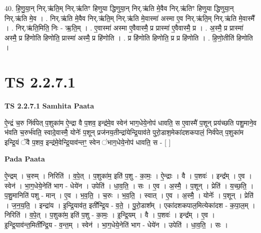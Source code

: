 \documentclass[17pt]{extarticle}
\begin{document}
40. हि॒णु॒या॒न् निर्.ऋ॑ति॒म् निर्.ऋ॑तिꣳ हिणुया द्धिणुया॒न् निर्.ऋ॑ति मे॒वैव निर्.ऋ॑तिꣳ हिणुया द्धिणुया॒न् निर्.ऋ॑ति मे॒व । . निर्.ऋ॑ति मे॒वैव निर्.ऋ॑ति॒म् निर्.ऋ॑ति मे॒वास्मा॑ अस्मा ए॒व निर्.ऋ॑ति॒म् निर्.ऋ॑ति मे॒वास्मै᳚ । . निर्.ऋ॑ति॒मिति॒ निः - ऋ॒ति॒म् । . ए॒वास्मा॑ अस्मा ए॒वैवास्मै॒ प्र प्रास्मा॑ ए॒वैवास्मै॒ प्र । . अ॒स्मै॒ प्र प्रास्मा॑ अस्मै॒ प्र हि॑णोति हिणोति॒ प्रास्मा॑ अस्मै॒ प्र हि॑णोति । . प्र हि॑णोति हिणोति॒ प्र प्र हि॑णोति । . हि॒णो॒तीति॑ हिणोति । \newline
\pagebreak
{}
\section*{ TS 2.2.7.1 }

\textbf{TS 2.2.7.1 } \newline
\textbf{Samhita Paata} \newline

ऐ॒न्द्रं च॒रु निंर्व॑पेत् प॒शुका॑म ऐ॒न्द्रा वै प॒शव॒ इन्द्र॑मे॒व स्वेन॑ भाग॒धेये॒नोप॑ धावति॒ स ए॒वास्मै॑ प॒शून् प्रय॑च्छति पशु॒माने॒व भ॑वति च॒रुर्भ॑वति॒ स्वादे॒वास्मै॒ योनेः᳚ प॒शून् प्रज॑नय॒तीन्द्रा॑येन्द्रि॒याव॑ते पुरो॒डाश॒मेका॑दशकपालं॒ निर्व॑पेत् प॒शुका॑म इन्द्रि॒यं ॅवै प॒शव॒ इन्द्र॑मे॒वेन्द्रि॒याव॑न्तꣳ॒॒ स्वेन ॑भाग॒धेये॒नोप॑ धावति॒ स - [  ] \newline

\textbf{Pada Paata} \newline

ऐ॒न्द्रम् । च॒रुम् । निरिति॑ । व॒पे॒त् । प॒शुका॑म॒ इति॑ प॒शु - का॒मः॒ । ऐ॒न्द्राः । वै । प॒शवः॑ । इन्द्र᳚म् । ए॒व । स्वेन॑ । भा॒ग॒धेये॒नेति॑ भाग - धेये॑न । उपेति॑ । धा॒व॒ति॒ । सः । ए॒व । अ॒स्मै॒ । प॒शून् । प्रेति॑ । य॒च्छ॒ति॒ । प॒शु॒मानिति॑ पशु - मान् । ए॒व । भ॒व॒ति॒ । च॒रुः । भ॒व॒ति॒ । स्वात् । ए॒व । अ॒स्मै॒ । योनेः᳚ । प॒शून् । प्रेति॑ । ज॒न॒य॒ति॒ । इन्द्रा॑य । इ॒न्द्रि॒याव॑त॒ इती᳚न्द्रि॒य - व॒ते॒ । पु॒रो॒डाश᳚म् । एका॑दशकपाल॒मित्येका॑दश - क॒पा॒ल॒म् । निरिति॑ । व॒पे॒त् । प॒शुका॑म॒ इति॑ प॒शु - का॒मः॒ । इ॒न्द्रि॒यम् । वै । प॒शवः॑ । इन्द्र᳚म् । ए॒व । इ॒न्द्रि॒याव॑न्त॒मिती᳚न्द्रि॒य - व॒न्त॒म् । स्वेन॑ । भा॒ग॒धेये॒नेति॑ भाग - धेये॑न । उपेति॑ । धा॒व॒ति॒ । सः ।  \newline
\end{document}

